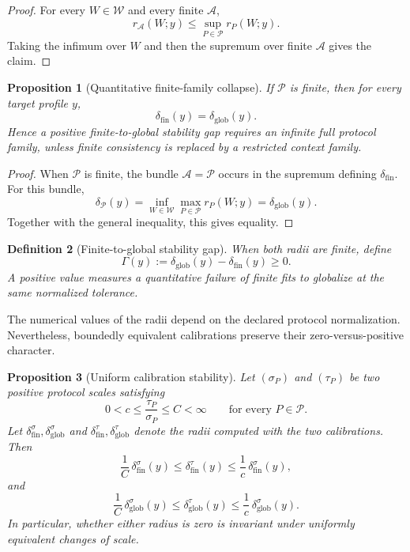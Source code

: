 \documentclass[11pt]{article}
\newtheorem{definition}{Definition}[section]
\newtheorem{proposition}[definition]{Proposition}
\newcommand{\W}{\mathcal W}
\newcommand{\Pcal}{\mathcal P}
\newcommand{\Acal}{\mathcal A}
\begin{document}
\begin{proof}
For every $W\in\W$ and every finite $\Acal$,
\[
r_{\Acal}(W;y)
\le
\sup_{P\in\Pcal}r_P(W;y).
\]
Taking the infimum over $W$ and then the supremum over finite $\Acal$ gives the
claim.
\end{proof}

\begin{proposition}[Quantitative finite-family collapse]
If $\Pcal$ is finite, then for every target profile $y$,
\[
\delta_{\mathrm{fin}}(y)
=
\delta_{\mathrm{glob}}(y).
\]
Hence a positive finite-to-global stability gap requires an infinite full
protocol family, unless finite consistency is replaced by a restricted context
family.
\end{proposition}

\begin{proof}
When $\Pcal$ is finite, the bundle $\Acal=\Pcal$ occurs in the supremum defining
$\delta_{\mathrm{fin}}$. For this bundle,
\[
\delta_{\Pcal}(y)
=
\inf_{W\in\W}
\max_{P\in\Pcal}r_P(W;y)
=
\delta_{\mathrm{glob}}(y).
\]
Together with the general inequality, this gives equality.
\end{proof}

\begin{definition}[Finite-to-global stability gap]
When both radii are finite, define
\[
\Gamma(y)
:=
\delta_{\mathrm{glob}}(y)
-
\delta_{\mathrm{fin}}(y)
\ge0.
\]
A positive value measures a quantitative failure of finite fits to globalize
at the same normalized tolerance.
\end{definition}

The numerical values of the radii depend on the declared protocol
normalization. Nevertheless, boundedly equivalent calibrations preserve their
zero-versus-positive character.

\begin{proposition}[Uniform calibration stability]
Let $(\sigma_P)$ and $(\tau_P)$ be two positive protocol scales satisfying
\[
0<c\le
\frac{\tau_P}{\sigma_P}
\le C<\infty
\qquad
\text{for every }P\in\Pcal.
\]
Let $\delta^{\sigma}_{\mathrm{fin}},
\delta^{\sigma}_{\mathrm{glob}}$ and
$\delta^{\tau}_{\mathrm{fin}},
\delta^{\tau}_{\mathrm{glob}}$
denote the radii computed with the two calibrations. Then
\[
\frac1C\,
\delta^{\sigma}_{\mathrm{fin}}(y)
\le
\delta^{\tau}_{\mathrm{fin}}(y)
\le
\frac1c\,
\delta^{\sigma}_{\mathrm{fin}}(y),
\]
and
\[
\frac1C\,
\delta^{\sigma}_{\mathrm{glob}}(y)
\le
\delta^{\tau}_{\mathrm{glob}}(y)
\le
\frac1c\,
\delta^{\sigma}_{\mathrm{glob}}(y).
\]
In particular, whether either radius is zero is invariant under uniformly
equivalent changes of scale.
\end{proposition}
\end{document}
